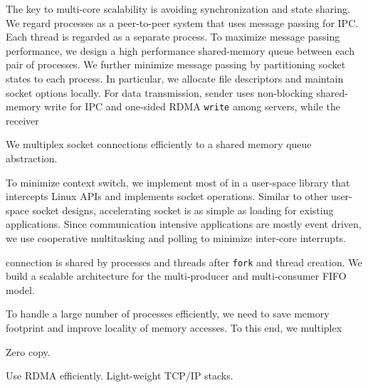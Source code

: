 The key to multi-core scalability is avoiding synchronization and state sharing. We regard processes as a peer-to-peer system that uses message passing for IPC. Each thread is regarded as a separate process. To maximize message passing performance, we design a high performance shared-memory queue between each pair of processes. We further minimize message passing by partitioning socket states to each process. In particular, we allocate file descriptors and maintain socket options locally. For data transmission, sender uses non-blocking shared-memory write for IPC and one-sided RDMA \texttt{write} among servers, while the receiver 

We multiplex socket connections efficiently to a shared memory queue abstraction. 


To minimize context switch, we implement most of \sys{} in a user-space library \libipc{} that intercepts Linux APIs and implements socket operations. Similar to other user-space socket designs, accelerating socket is as simple as loading \libipc{} for existing applications. Since communication intensive applications are mostly event driven, we use cooperative multitasking and polling to minimize inter-core interrupts.



connection is shared by processes and threads after \texttt{fork} and thread creation. We build a scalable architecture for the multi-producer and multi-consumer FIFO model.

To handle a large number of processes efficiently, we need to save memory footprint and improve locality of memory accesses. To this end, we multiplex

Zero copy.

Use RDMA efficiently. Light-weight TCP/IP stacks.
